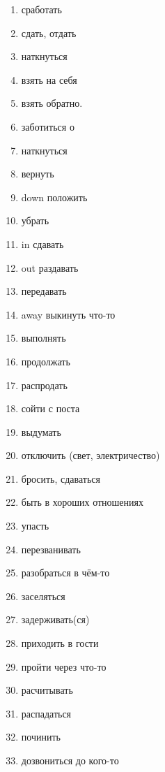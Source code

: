 \begin{enumerate}
    \item {} сработать
    \item {} сдать, отдать 
    \item {} наткнуться
    \item {} взять на себя
    \item {} взять обратно.
    \item {} заботиться о
    \item {} наткнуться
    \item {} вернуть
    \item {} down положить
    \item {} убрать
    \item {} in сдавать
    \item {} out раздавать
    \item {} передавать
    \item {} away выкинуть что-то
    \item {} выполнять
    \item {} продолжать
    \item {} распродать
    \item {} сойти с поста 
    \item {} выдумать
    \item {} отключить (свет, электричество)
    \item {} бросить, сдаваться 
    \item {} быть в хороших отношениях
    \item {} упасть
    \item {} перезванивать
    \item {} разобраться в чём-то
    \item {} заселяться
    \item {} задерживать(ся)
    \item {} приходить в гости
    \item {} пройти через что-то
    \item {} расчитывать
    \item {} распадаться 
    \item {} починить 
    \item {} дозвониться до кого-то 

\end{enumerate}
